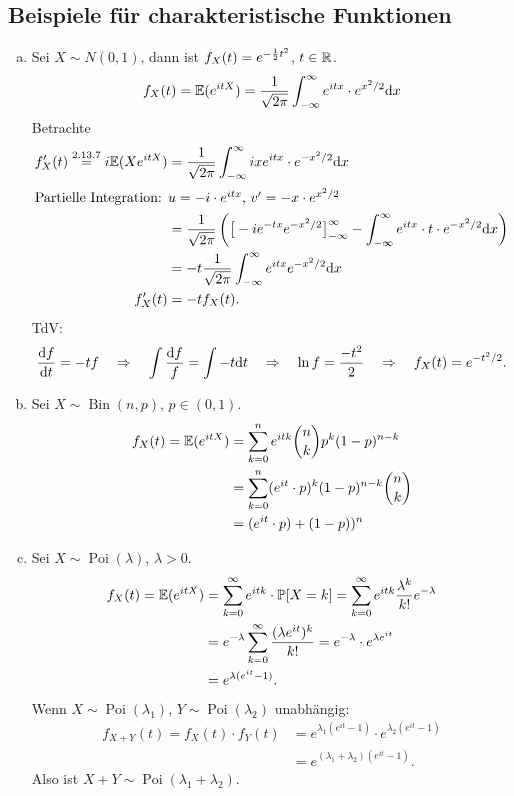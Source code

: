 \subsection*{Beispiele für charakteristische Funktionen}
\begin{enumerate}[a)]
\item Sei $X \sim N(0,1)$, dann ist $f_X(t) = e^{-\frac{1}{2}t^2}$, $t \in \mathbb{R}$.
  \[ f_X(t) = \mathbb{E}(e^{itX}) = \frac{1}{\sqrt{2 \pi}} \int_{-\infty}^\infty e^{itx}
    \cdot e^{x^2/2} \mathrm{d} x \]
  Betrachte
  \begin{align*}
    f'_X(t) \overset{2.13.7}{=} i \mathbb{E}(X e^{itX} )
    &= \frac{1}{\sqrt{2 \pi}} \int_{-\infty}^\infty i x e^{itx} \cdot e^{-x^2/2} \mathrm{d} x \\
    \intertext{Partielle Integration: $u = -i \cdot e^{itx}$, $v' = -x \cdot e^{x^2/2}$}
    &= \frac{1}{\sqrt{2 \pi}} \left( \big[ -i e^{-tx} e^{-x^2/2} \big]_{-\infty}^\infty
      - \int_{-\infty}^\infty e^{itx} \cdot t \cdot e^{-x^2/2} \mathrm{d} x \right) \\
    &= -t \frac{1}{\sqrt{2 \pi}} \int_{-\infty}^\infty e^{itx} e^{-x^2/2} \mathrm{d} x \\
    f'_X(t) &= -t f_X(t).
  \end{align*}
  TdV:
  \[ \frac{\mathrm{d} f}{\mathrm{d} t} = - t f \quad \Rightarrow \quad \int \frac{\mathrm{d} f}{f} = \int -t \mathrm{d} t \quad \Rightarrow \quad
    \ln f = \frac{-t^2}{2} \quad \Rightarrow \quad f_X(t) = e^{-t^2/2}. \]
\item Sei $X \sim \operatorname{Bin}(n,p)$, $p \in (0,1)$.
  \begin{align*}
    f_X(t) = \mathbb{E}( e^{itX} )
    &= \sum_{k=0}^n e^{itk} \binom{n}{k} p^k (1-p)^{n-k} \\
    &= \sum_{k=0}^n (e^{it} \cdot p)^k (1-p)^{n-k} \binom{n}{k} \\
    &= (e^{it} \cdot p) + (1-p))^n
  \end{align*}
\item Sei $X \sim \operatorname{Poi}(\lambda)$, $\lambda > 0$.
  \begin{align*}
    f_X(t) = \mathbb{E}( e^{itX} )
    &= \sum_{k=0}^\infty e^{itk} \cdot \mathbb{P}[ X = k ]
      = \sum_{k=0}^\infty e^{itk} \frac{\lambda^k}{k!} e^{-\lambda} \\
    &= e^{-\lambda} \sum_{k=0}^\infty \frac{(\lambda e^{it})^k}{k!}
      = e^{-\lambda} \cdot e^{\lambda e^{it}} \\
    &= e^{\lambda( e^{it} - 1)}.
  \end{align*}
  Wenn $X \sim \operatorname{Poi}(\lambda_1)$, $Y \sim
  \operatorname{Poi}(\lambda_2)$ unabhängig:
  \begin{align*}
    f_{X+Y}(t) = f_X(t) \cdot f_Y(t)
    &= e^{\lambda_1 ( e^{it} - 1)} \cdot e^{\lambda_2 ( e^{it} - 1)} \\
    &= e^{(\lambda_1 + \lambda_2) ( e^{it} - 1)}.
  \end{align*}
  Also ist $X + Y \sim \operatorname{Poi}(\lambda_1 + \lambda_2)$.
\end{enumerate}

